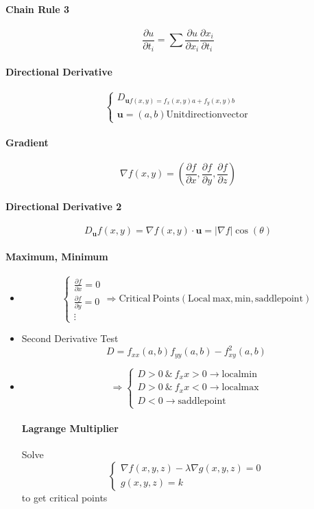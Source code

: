 \documentclass[12pt]{article}
\begin{document}
	
\paragraph{Chain Rule 3}
\[\frac{\partial u}{\partial t_i} = \sum \frac{\partial u}{\partial x_i}\frac{\partial x_i}{\partial t_i}\]

\paragraph{Directional Derivative}
\[
	\begin{cases}
		D_{\mathbf{u}f(x, y) = f_x(x, y)a + f_y(x, y)b}\\
		\mathbf{u} = (a, b)\mathrm{Unit direction vector}
	\end{cases}
\]

\paragraph{Gradient}
\[\nabla f(x, y) = (\frac{\partial f}{\partial x}, \frac{\partial f}{\partial y}, \frac{\partial f}{\partial z})\]

\paragraph{Directional Derivative 2}
\[D_{\mathbf{u}}f(x, y) = \nabla f(x, y)\cdot \mathbf{u} = |\nabla f|\cos(\theta)\]

\paragraph{Maximum, Minimum}
\begin{itemize}
	\item 
		\[
			\begin{cases}
				\frac{\partial f}{\partial x} = 0\\
				\frac{\partial f}{\partial y} = 0\\
				\vdots
			\end{cases}
			\Rightarrow \mathrm{Critical\ Points(Local\ max, min, saddle point)}
		\]
	\item Second Derivative Test
	\[D = f_{xx}(a, b)f_{yy}(a, b) - f^2_{xy}(a, b)\]
	
	\item 
	\[  \Rightarrow
		\begin{cases}
			D > 0\ \&\ f_xx > 0 \rightarrow \mathrm{local min}\\
			D > 0\ \&\ f_xx < 0 \rightarrow \mathrm{local max}\\
			D < 0 \rightarrow \mathrm{saddle point}
		\end{cases}
	\]
	
\paragraph{Lagrange Multiplier}
Solve
\[
	\begin{cases}
		\nabla f(x, y, z) - \lambda \nabla g(x, y, z) = 0\\
		g(x, y, z) = k
	\end{cases}
\]
to get critical points
\end{itemize}
\end{document}
